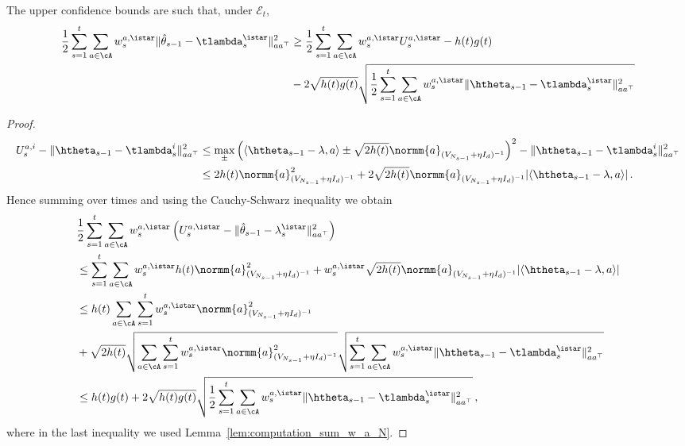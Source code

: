 \begin{lemma}
The upper confidence bounds are such that, under $\mathcal E_t$,
\begin{align*}
    \frac{1}{2}\sum_{s=1}^t \sum_{a\in\cA} w_s^{a,\istar}\Vert \hat{\theta}_{s-1} - \tlambda_s^{\istar}\Vert_{a a^\top}^2\label{eq:only_istar}
    &\ge \frac{1}{2}\sum_{s=1}^t\sum_{a\in\cA} w_s^{a,\istar}U_s^{a,\istar} - h(t)g(t)\\ 
    &-2\sqrt{ h(t) g(t)}  \sqrt{\frac{1}{2}\sum_{s=1}^t \sum_{a\in\cA} w_s^{a,\istar}\Vert \htheta_{s-1} - \tlambda_s^{\istar} \Vert_{a a^\top}^2}
\end{align*}
\end{lemma}
\begin{proof}
\begin{align*}
U_s^{a,i} -\Vert \htheta_{s-1} - \tlambda_s^i\Vert_{a a^\top}^2
&\leq   \max_\pm \left( \langle \htheta_{s-1} - \lambda,a\rangle \pm \sqrt{2 h(t)} \normm{a}_{(V_{N_{s-1}}+ \eta I_d)^{-1}} \right)^2-\Vert \htheta_{s-1} - \tlambda_s^i\Vert_{a a^\top}^2\\
&\leq  2h(t)\normm{a}^2_{(V_{N_{s-1}}+ \eta I_d)^{-1}} + 2\sqrt{2 h(t)} \normm{a}_{(V_{N_{s-1}}+ \eta I_d)^{-1}}| \langle \htheta_{s-1} - \lambda,a\rangle|\,.\\
\end{align*}
Hence summing over times and using the Cauchy-Schwarz inequality we obtain
\begin{align*}
&\frac{1}{2}\sum_{s=1}^t\sum_{a\in\cA} w_s^{a,\istar}\left(U_s^{a,\istar} -\Vert \hat{\theta}_{s-1} - \lambda_s^{\istar}\Vert_{a a^\top}^2\right)
\\
&\le \sum_{s=1}^t \sum_{a\in\cA} w_s^{a,\istar}h(t)\normm{a}^2_{(V_{N_{s-1}}+ \eta I_d)^{-1}} +w_s^{a,\istar} \sqrt{2 h(t)} \normm{a}_{(V_{N_{s-1}}+ \eta I_d)^{-1}}| \langle \htheta_{s-1} - \lambda,a\rangle|
\\
&\le  h(t) \sum_{a\in\cA} \sum_{s=1}^t w_s^{a,\istar}\normm{a}^2_{(V_{N_{s-1}}+ \eta I_d)^{-1}}\\
&+ \sqrt{2 h(t)} \sqrt{\sum_{a\in\cA} \sum_{s=1}^t w_s^{a,\istar}\normm{a}^2_{(V_{N_{s-1}}+ \eta I_d)^{-1}}}  \sqrt{\sum_{s=1}^t \sum_{a\in\cA} w_s^{a,\istar}\Vert \htheta_{s-1} - \tlambda_s^{\istar} \Vert_{a a^\top}^2} \\
&\leq h(t)g(t) +2\sqrt{ h(t) g(t)}  \sqrt{\frac{1}{2}\sum_{s=1}^t \sum_{a\in\cA} w_s^{a,\istar}\Vert \htheta_{s-1} - \tlambda_s^{\istar} \Vert_{a a^\top}^2}\,,
\end{align*}
where in the last inequality we used Lemma~\ref{lem:computation_sum_w_a_N}.
\end{proof}

